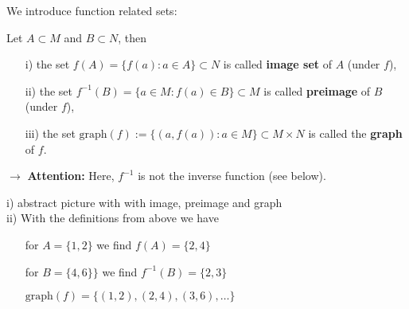 \begin{frame}
	We introduce function related sets: \vspace{-0.3cm}
	\begin{defi}\label{def:image_preimage_graph}
		Let $A \subset M$ and $B \subset N$, then
		\begin{itemize} \color{defgruen}
			\item[i)] the set $f(A) = \{f(a) : a\in A\} \subset N$ is called \textbf{image set} of $A$ (under $f$),
			\item[ii)] the set $f^{-1}(B)=\lbrace a\in M: f(a)\in B\rbrace \subset M$ is called \textbf{preimage} of $B$ (under $f$),
			\item[iii)] the set $\text{graph}(f) := \{(a,f(a))\colon a \in M\} \subset M\times N$ is called the \textbf{graph} of $f$.
		\end{itemize} 
	\end{defi}
	$\rightarrow$ \textbf{Attention:} Here, $f^{-1}$ is not the inverse function (see below).\\ \vspace{0.2cm}
	{\blank
	i) abstract picture with  with image, preimage and graph\\
	ii) With the definitions from above we have
	\begin{itemize}
		\blank
		\item[] for $A=\{1,2\}$ we find $f(A) = \{2,4\}$
		\item[] for $B=\{4,6\}\}$ we find $f^{-1}(B) = \{2,3\}$
		\item[] $\text{graph}(f) = \{(1,2), (2,4), (3,6), \ldots\}$
	\end{itemize}
}	
\end{frame}



